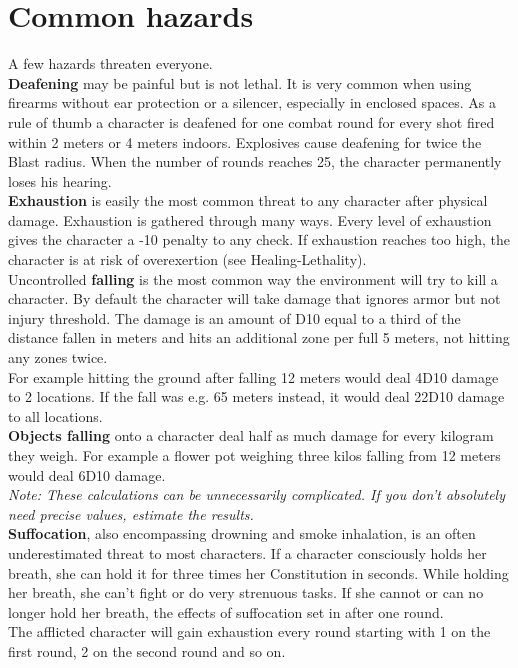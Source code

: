 \documentclass[12pt,a4paper,openany]{book}
\begin{document}
	\section{Common hazards}
	A few hazards threaten everyone.\\
	\textbf{Deafening} may be painful but is not lethal. It is very common when using firearms without ear protection or a silencer, especially in enclosed spaces. As a rule of thumb a character is deafened for one combat round for every shot fired within 2 meters or 4 meters indoors. Explosives cause deafening for twice the Blast radius. When the number of rounds reaches 25, the character permanently loses his hearing.\\
	\textbf{Exhaustion} is easily the most common threat to any character after physical damage. Exhaustion is gathered through many ways. Every level of exhaustion gives the character a -10 penalty to any check. If exhaustion reaches too high, the character is at risk of overexertion (see Healing-Lethality).\\
	Uncontrolled \textbf{falling} is the most common way the environment will try to kill a character. By default the character will take damage that ignores armor but not injury threshold. The damage is an amount of D10 equal to a third of the distance fallen in meters and hits an additional zone per full 5 meters, not hitting any zones twice.\\
	For example hitting the ground after falling 12 meters would deal 4D10 damage to 2 locations. If the fall was e.g. 65 meters instead, it would deal 22D10 damage to all locations.\\
	\textbf{Objects falling} onto a character deal half as much damage for every kilogram they weigh. For example a flower pot weighing three kilos falling from 12 meters would deal 6D10 damage.\\
	\emph{Note: These calculations can be unnecessarily complicated. If you don't absolutely need precise values, estimate the results.}\\
	\textbf{Suffocation}, also encompassing drowning and smoke inhalation, is an often underestimated threat to most characters. If a character consciously holds her breath, she can hold it for three times her Constitution in seconds. While holding her breath, she can’t fight or do very strenuous tasks. If she cannot or can no longer hold her breath, the effects of suffocation set in after one round.\\
	The afflicted character will gain exhaustion every round starting with 1 on the first round, 2 on the second round and so on.\\
\end{document}
